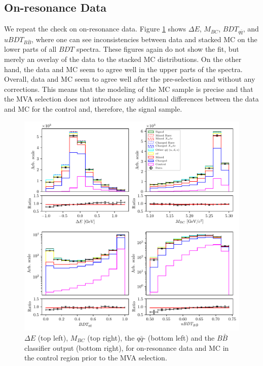 \subsection{On-resonance Data}

We repeat the check on on-resonance data. Figure \ref{fig:onres_control} shows $\Delta E$, $M_{BC}$, $BDT_{q \bar q}$, and $uBDT_{B \bar B}$, where one can see inconsistencies between data and stacked MC on the lower parts of all $BDT$ spectra. These figures again do not show the fit, but merely an overlay of the data to the stacked MC distributions. On the other hand, the data and MC seem to agree well in the upper parts of the spectra. Overall, data and MC seem to agree well after the pre-selection and without any corrections. This means that the modeling of the MC sample is precise and that the MVA selection does not introduce any additional differences between the data and MC for the control and, therefore, the signal sample.
\begin{figure}[H]
	\centering
	\captionsetup{width=0.8\linewidth}
	\includegraphics[width=\linewidth]{fig/onres_control}
	\caption{$\Delta E$ (top left), $M_{BC}$ (top right), the $q \bar q$- (bottom left) and the $B \bar B$ classifier output (bottom right), for on-resonance data and MC in the control region prior to the MVA selection.}
	\label{fig:onres_control}
\end{figure}
